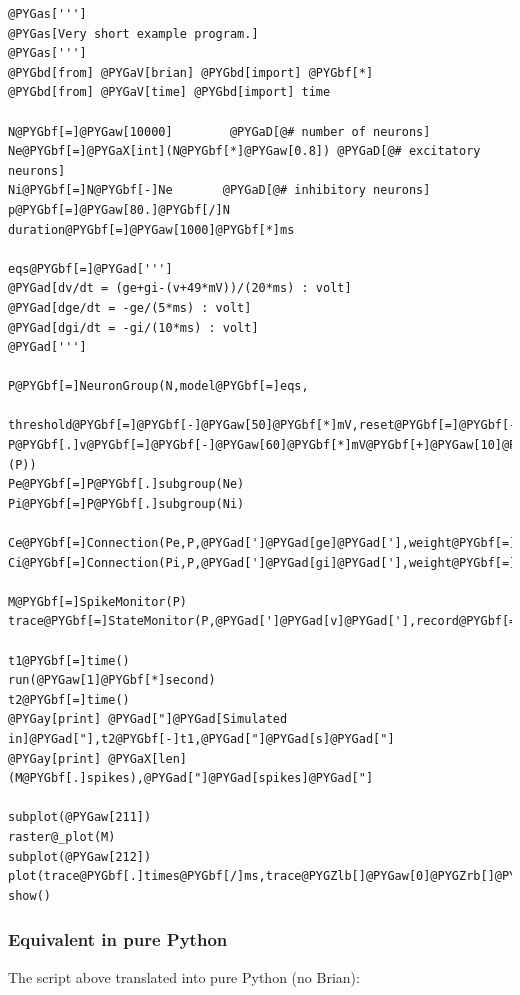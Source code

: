 \documentclass[letterpaper,10pt,english]{manual}
\begin{document}
\begin{Verbatim}[commandchars=@\[\]]
@PYGas[''']
@PYGas[Very short example program.]
@PYGas[''']
@PYGbd[from] @PYGaV[brian] @PYGbd[import] @PYGbf[*]
@PYGbd[from] @PYGaV[time] @PYGbd[import] time

N@PYGbf[=]@PYGaw[10000]        @PYGaD[@# number of neurons]
Ne@PYGbf[=]@PYGaX[int](N@PYGbf[*]@PYGaw[0.8]) @PYGaD[@# excitatory neurons]
Ni@PYGbf[=]N@PYGbf[-]Ne       @PYGaD[@# inhibitory neurons]
p@PYGbf[=]@PYGaw[80.]@PYGbf[/]N
duration@PYGbf[=]@PYGaw[1000]@PYGbf[*]ms

eqs@PYGbf[=]@PYGad[''']
@PYGad[dv/dt = (ge+gi-(v+49*mV))/(20*ms) : volt]
@PYGad[dge/dt = -ge/(5*ms) : volt]
@PYGad[dgi/dt = -gi/(10*ms) : volt]
@PYGad[''']

P@PYGbf[=]NeuronGroup(N,model@PYGbf[=]eqs,
              threshold@PYGbf[=]@PYGbf[-]@PYGaw[50]@PYGbf[*]mV,reset@PYGbf[=]@PYGbf[-]@PYGaw[60]@PYGbf[*]mV)
P@PYGbf[.]v@PYGbf[=]@PYGbf[-]@PYGaw[60]@PYGbf[*]mV@PYGbf[+]@PYGaw[10]@PYGbf[*]mV@PYGbf[*]rand(@PYGaX[len](P))
Pe@PYGbf[=]P@PYGbf[.]subgroup(Ne)
Pi@PYGbf[=]P@PYGbf[.]subgroup(Ni)

Ce@PYGbf[=]Connection(Pe,P,@PYGad[']@PYGad[ge]@PYGad['],weight@PYGbf[=]@PYGaw[1.62]@PYGbf[*]mV,sparseness@PYGbf[=]p)
Ci@PYGbf[=]Connection(Pi,P,@PYGad[']@PYGad[gi]@PYGad['],weight@PYGbf[=]@PYGbf[-]@PYGaw[9]@PYGbf[*]mV,sparseness@PYGbf[=]p)

M@PYGbf[=]SpikeMonitor(P)
trace@PYGbf[=]StateMonitor(P,@PYGad[']@PYGad[v]@PYGad['],record@PYGbf[=]@PYGaw[0])

t1@PYGbf[=]time()
run(@PYGaw[1]@PYGbf[*]second)
t2@PYGbf[=]time()
@PYGay[print] @PYGad["]@PYGad[Simulated in]@PYGad["],t2@PYGbf[-]t1,@PYGad["]@PYGad[s]@PYGad["]
@PYGay[print] @PYGaX[len](M@PYGbf[.]spikes),@PYGad["]@PYGad[spikes]@PYGad["]

subplot(@PYGaw[211])
raster@_plot(M)
subplot(@PYGaw[212])
plot(trace@PYGbf[.]times@PYGbf[/]ms,trace@PYGZlb[]@PYGaw[0]@PYGZrb[]@PYGbf[/]mV)
show()
\end{Verbatim}


\subsubsection{Equivalent in pure Python}

The script above translated into pure Python (no Brian):
\end{document}
